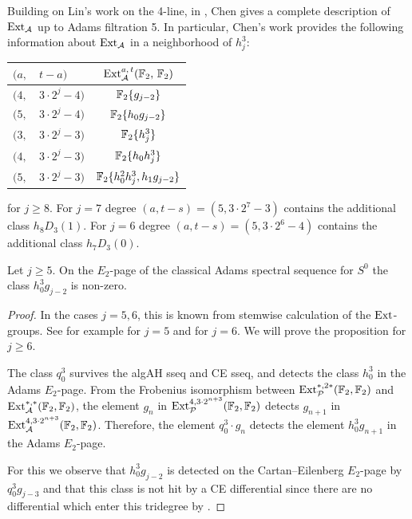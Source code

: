 \begin{rec} \label{rec:Chen}
  Building on Lin's work on the 4-line, in \cite[Theorem~1.2]{Ext5}, Chen gives a complete description of $\operatorname{\mathrm{Ext}}_{\operatorname{\mathcal{A}}}$ up to Adams filtration 5.
  In particular, Chen's work provides the following information about $\operatorname{\mathrm{Ext}}_{\operatorname{\mathcal{A}}}$ in a neighborhood of $h_j^3$:
  \begin{center}{\renewcommand{\arraystretch}{1.2}
      \begin{tabular}{|ll|c|}\hline
        $(a,$ & $t-a)$ & $\operatorname{\mathrm{Ext}}^{a,\,t}_{\operatorname{\mathcal{A}}}(\mathbb{F}_2,\, \mathbb{F}_2)$ \\\hline\hline
        $(4,$ & $ 3 \cdot 2^j-4)$ & $\operatorname{\mathbb{F}}_2\{g_{j-2}\}$ \\\hline
        $(5,$ & $ 3 \cdot 2^j-4)$ & $\operatorname{\mathbb{F}}_2\{h_0g_{j-2}\}$ \\\hline
        $(3,$ & $ 3 \cdot 2^j-3)$ & $\operatorname{\mathbb{F}}_2\{h_j^3\}$ \\\hline
        $(4,$ & $ 3 \cdot 2^j-3)$ & $\operatorname{\mathbb{F}}_2\{h_0h_j^3\}$ \\\hline
        $(5,$ & $ 3 \cdot 2^j-3)$ & $\operatorname{\mathbb{F}}_2\{h_0^2h_j^3, h_1g_{j-2}\}$ \\\hline    
      \end{tabular}}
  \end{center}  
  for $j \geq 8$.
  For $j=7$ degree $(a,t-s)=(5,3 \cdot 2^{7} - 3)$ contains the additional class $h_8D_3(1)$.
  For $j=6$ degree $(a,t-s)=(5,3 \cdot 2^{6} - 4)$ contains the additional class $h_7D_3(0)$.
\end{rec}

\begin{prop} \label{prop:g survives}
  Let $j \geq 5$.
  On the $E_2$-page of the classical Adams spectral sequence for $S^{0}$
  the class $h_0^3g_{j-2}$ is non-zero.
\end{prop}

\begin{proof}
  In the cases $j=5,6$, this is known from stemwise calculation of the $\operatorname{\mathrm{Ext}}$-groups.
  See for example \cite{Bruner2, IWX2} for $j=5$ and \cite{Nassau} for $j=6$.
  We will prove the proposition for $j \geq 6$.
        

  The class $q_0^3$ survives the algAH sseq and CE sseq, and detects the class $h_0^3$ in the Adams $E_2$-page. From the Frobenius isomorphism between $\operatorname{\mathrm{Ext}}_{\mathcal{P}}^{*,2*}(\operatorname{\mathbb{F}}_2, \operatorname{\mathbb{F}}_2)$ and $\operatorname{\mathrm{Ext}}_{\mathcal{A}}^{*,*}(\operatorname{\mathbb{F}}_2, \operatorname{\mathbb{F}}_2)$, the element $g_n$ in $\operatorname{\mathrm{Ext}}_{\mathcal{P}}^{4, 3\cdot 2^{n+3}}(\operatorname{\mathbb{F}}_2, \operatorname{\mathbb{F}}_2)$ detects $g_{n+1}$ in $\operatorname{\mathrm{Ext}}_{\mathcal{A}}^{4, 3\cdot 2^{n+3}}(\operatorname{\mathbb{F}}_2, \operatorname{\mathbb{F}}_2)$. Therefore, the element $q_0^3 \cdot g_n$ detects the element $h_0^3 g_{n+1}$ in the Adams $E_2$-page.
  
  For this we observe that $h_0^3g_{j-2}$ is detected on the Cartan--Eilenberg $E_2$-page by $q_0^3 g_{j-3}$ and that this class is not hit by a CE differential since there are no differential which enter this tridegree by .
\end{proof}

